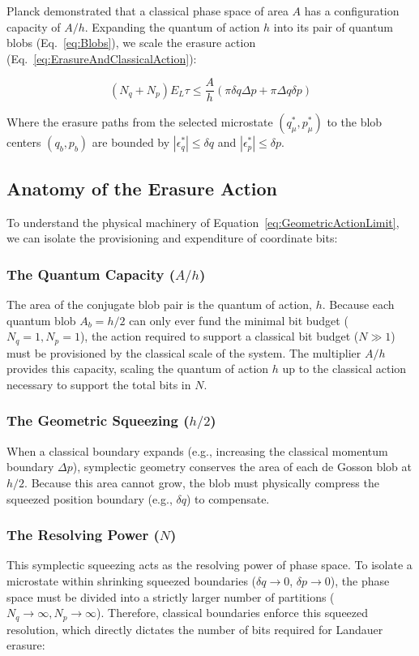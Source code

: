 \documentclass[%
  aps, reprint, prl, amsmath,amssymb
]{revtex4-2}
\begin{document}
Planck demonstrated \cite{Planck1906} that a classical phase space of area $A$ has a configuration capacity of $A/h$. Expanding the quantum of action $h$ into its pair of quantum blobs (Eq.~\ref{eq:Blobs}), we scale the erasure action (Eq.~\ref{eq:ErasureAndClassicalAction}):

\begin{equation}
\label{eq:GeometricActionLimit}
(N_q + N_p) E_L \tau \le \frac{A}{h} (\pi \delta q \Delta p + \pi \Delta q \delta p)
\end{equation}

Where the erasure paths from the selected microstate $(q_\mu^*, p_\mu^*)$ to the blob centers $(q_b, p_b)$ are bounded by $|\epsilon_q^*| \le \delta q$ and $|\epsilon_p^*| \le \delta p$.

\subsection{Anatomy of the Erasure Action}

To understand the physical machinery of Equation~\ref{eq:GeometricActionLimit}, we can isolate the provisioning and expenditure of coordinate bits:

\subsubsection{The Quantum Capacity ($A/h$)}
The area of the conjugate blob pair is the quantum of action, $h$. Because each quantum blob $A_b = h/2$ can only ever fund the minimal bit budget ($N_q = 1, N_p = 1$), the action required to support a classical bit budget ($N \gg 1$) must be provisioned by the classical scale of the system. The multiplier $A/h$ provides this capacity, scaling the quantum of action $h$ up to the classical action necessary to support the total bits in $N$.

\subsubsection{The Geometric Squeezing ($h/2$)}
When a classical boundary expands (e.g., increasing the classical momentum boundary $\Delta p$), symplectic geometry conserves the area of each de Gosson blob at $h/2$. Because this area cannot grow, the blob must physically compress the squeezed position boundary (e.g., $\delta q$) to compensate.

\subsubsection{The Resolving Power ($N$)}
This symplectic squeezing acts as the resolving power of phase space. To isolate a microstate within shrinking squeezed boundaries ($\delta q \to 0$, $\delta p \to 0$), the phase space must be divided into a strictly larger number of partitions ($N_q \to \infty, N_p \to \infty$). Therefore, classical boundaries enforce this squeezed resolution, which directly dictates the number of bits required for Landauer erasure:
\end{document}
